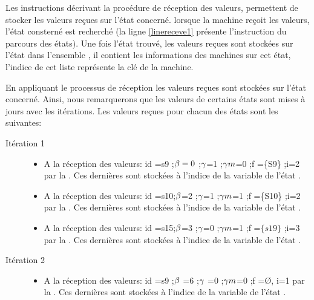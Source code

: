Les instructions décrivant la procédure de réception des valeurs, permettent de stocker les valeurs reçues sur l'état concerné. lorsque la machine reçoit les valeurs, l'état consterné est recherché (la ligne \ref{linereceve1} présente l'instruction du parcours des états). Une fois l'état trouvé, les valeurs reçues sont stockées sur l'état dans l'ensemble , il contient les informations des machines sur cet état, l'indice de cet liste représente la clé de la machine. 

\begin{Exemple}\label{ea4}
	En appliquant le processus de réception les valeurs reçues sont stockées sur l'état concerné. Ainsi, nous remarquerons que les valeurs de certains états sont mises à jours avec les itérations.  Les valeurs reçues pour chacun des états sont les suivantes:
	
	\begin{description}
	\item[Itération 1]
		\begin{itemize}
		\item A la réception des valeurs: id =s9 ;$\beta{}=0$ ;$\gamma{}$=1 ;$\gamma m{}$=0 ;f =\{S9\} ;i=2 par la \mone{}. Ces dernières sont stockées à l'indice  de la variable   de l'état .
		
		\item A la réception des valeurs: id =s10;$\beta{}$=2 ;$\gamma{}$=1 ;$\gamma m{}$=1 ;f =\{S10\} ;i=2	 par la \mone{}. Ces dernières sont stockées à l'indice  de la variable   de l'état .
		
		\item A la réception des valeurs: id =s15;$\beta{}$=3 ;$\gamma{}$=0 ;$\gamma m{}$=1 ;f =$\{s19\}$ ;i=3	 par  la \mtwo{}. Ces dernières sont stockées à l'indice  de la variable   de l'état .
		\end{itemize}
	\item[Itération 2]
		\begin{itemize}
			\item A la réception des valeurs: id =s9 ;$\beta{}$ =6 ;$\gamma{}$ =0 ;$\gamma m{}$=0 ;f =Ø, i=1 par la \mtwo{}. Ces dernières sont stockées à l'indice  de la variable   de l'état .
			

\end{itemize}
\end{description}
\end{Exemple}
